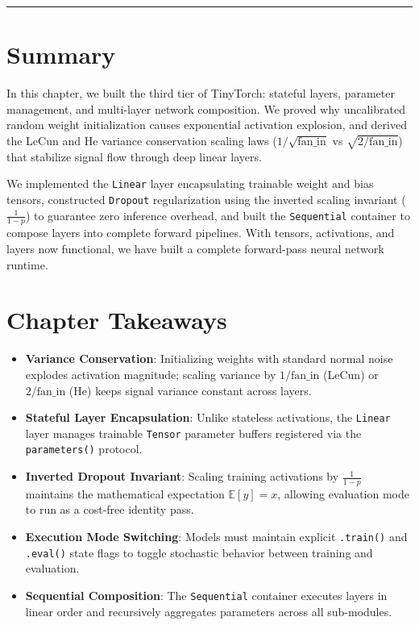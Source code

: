 \documentclass[
  letterpaper,
]{scrbook}
\providecommand{\tightlist}{%
  \setlength{\itemsep}{0pt}\setlength{\parskip}{0pt}}
\begin{document}
\begin{center}\rule{0.5\linewidth}{0.5pt}\end{center}

\section{Summary}\label{summary-3}

In this chapter, we built the third tier of TinyTorch: stateful layers,
parameter management, and multi-layer network composition. We proved why
uncalibrated random weight initialization causes exponential activation
explosion, and derived the LeCun and He variance conservation scaling
laws (\(1/\sqrt{\text{fan\_in}}\) vs \(\sqrt{2/\text{fan\_in}}\)) that
stabilize signal flow through deep linear layers.

We implemented the \texttt{Linear} layer encapsulating trainable weight
and bias tensors, constructed \texttt{Dropout} regularization using the
inverted scaling invariant (\(\frac{1}{1-p}\)) to guarantee zero
inference overhead, and built the \texttt{Sequential} container to
compose layers into complete forward pipelines. With tensors,
activations, and layers now functional, we have built a complete
forward-pass neural network runtime.

\section{Chapter Takeaways}\label{chapter-takeaways-3}

\begin{itemize}
\tightlist
\item
  \textbf{Variance Conservation}: Initializing weights with standard
  normal noise explodes activation magnitude; scaling variance by
  \(1/\text{fan\_in}\) (LeCun) or \(2/\text{fan\_in}\) (He) keeps signal
  variance constant across layers.
\item
  \textbf{Stateful Layer Encapsulation}: Unlike stateless activations,
  the \texttt{Linear} layer manages trainable \texttt{Tensor} parameter
  buffers registered via the \texttt{parameters()} protocol.
\item
  \textbf{Inverted Dropout Invariant}: Scaling training activations by
  \(\frac{1}{1-p}\) maintains the mathematical expectation
  \(\mathbb{E}[y] = x\), allowing evaluation mode to run as a cost-free
  identity pass.
\item
  \textbf{Execution Mode Switching}: Models must maintain explicit
  \texttt{.train()} and \texttt{.eval()} state flags to toggle
  stochastic behavior between training and evaluation.
\item
  \textbf{Sequential Composition}: The \texttt{Sequential} container
  executes layers in linear order and recursively aggregates parameters
  across all sub-modules.
\end{itemize}
\end{document}
